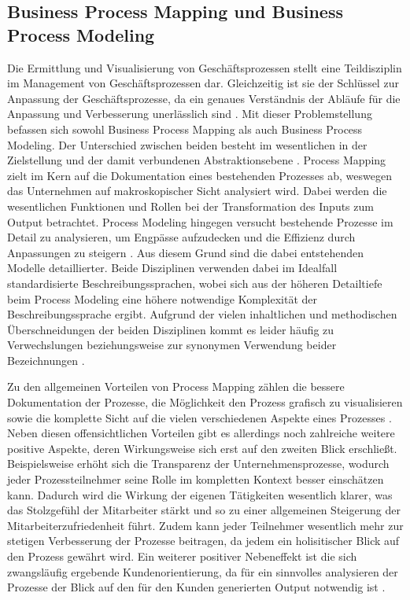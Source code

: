 \documentclass[a4paper,12pt]{report}
\begin{document}
\subsection{Business Process Mapping und Business Process Modeling}\label{subsec:BPMappingModeling}
Die Ermittlung und Visualisierung von Geschäftsprozessen stellt eine Teildisziplin im Management von Geschäftsprozessen dar. Gleichzeitig ist sie der Schlüssel zur Anpassung der Geschäftsprozesse, da ein genaues Verständnis der Abläufe für die Anpassung und Verbesserung unerlässlich sind \cite[vgl.][S. 6]{Jacka2009}. Mit dieser Problemstellung befassen sich sowohl Business Process Mapping als auch Business Process Modeling. Der Unterschied zwischen beiden besteht im wesentlichen in der Zielstellung und der damit verbundenen Abstraktionsebene \cite[vgl.][]{Smartdraw}. Process Mapping zielt im Kern auf die Dokumentation eines bestehenden Prozesses ab, weswegen das Unternehmen auf makroskopischer Sicht analysiert wird. Dabei werden die wesentlichen Funktionen und Rollen bei der Transformation des Inputs zum Output betrachtet. Process Modeling hingegen versucht bestehende Prozesse im Detail zu analysieren, um Engpässe aufzudecken und die Effizienz durch Anpassungen zu steigern \cite[vgl.][]{Appian}. Aus diesem Grund sind die dabei entstehenden Modelle detaillierter. Beide Disziplinen verwenden dabei im Idealfall standardisierte Beschreibungssprachen, wobei sich aus der höheren Detailtiefe beim Process Modeling eine höhere notwendige Komplexität der Beschreibungssprache ergibt. Aufgrund der vielen inhaltlichen und methodischen Überschneidungen der beiden Disziplinen kommt es leider häufig zu Verwechslungen beziehungsweise zur synonymen Verwendung beider Bezeichnungen \cite[vgl.][]{Smartdraw}.

Zu den allgemeinen Vorteilen von Process Mapping zählen die bessere Dokumentation der Prozesse, die Möglichkeit den Prozess grafisch zu visualisieren sowie die komplette Sicht auf die vielen verschiedenen Aspekte eines Prozesses \cite[vgl.][S. 8]{Jacka2009}. Neben diesen offensichtlichen Vorteilen gibt es allerdings noch zahlreiche weitere positive Aspekte, deren Wirkungsweise sich erst auf den zweiten Blick erschließt. Beispielsweise erhöht sich die Transparenz der Unternehmensprozesse, wodurch jeder Prozessteilnehmer seine Rolle im kompletten Kontext besser einschätzen kann. Dadurch wird die Wirkung der eigenen Tätigkeiten wesentlich klarer, was das Stolzgefühl der Mitarbeiter stärkt und so zu einer allgemeinen Steigerung der Mitarbeiterzufriedenheit führt. Zudem kann jeder Teilnehmer wesentlich mehr zur stetigen Verbesserung der Prozesse beitragen, da jedem ein holisitischer Blick auf den Prozess gewährt wird. Ein weiterer positiver Nebeneffekt ist die sich zwangsläufig ergebende Kundenorientierung, da für ein sinnvolles analysieren der Prozesse der Blick auf den für den Kunden generierten Output notwendig ist \cite[vgl.][S. 8-11]{Jacka2009}.
\end{document}
